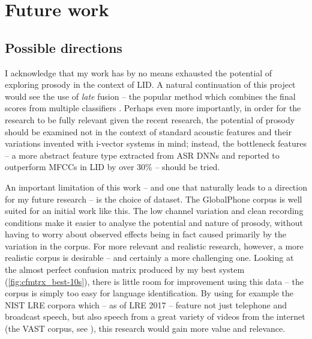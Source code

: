\documentclass[bsc,frontabs,twoside,singlespacing,parskip,deptreport]{infthesis}
\begin{document}
\chapter{Future work}{
  \label{chap:future-work}

  \section{Possible directions}{
    \label{sec:future-directions}

    I acknowledge that my work has by no means exhausted the potential of exploring prosody in the context of LID.
    A natural continuation of this project would see the use of \textit{late} fusion -- the popular method which combines the final scores from multiple classifiers \citep{Martinez_et_al_2012,Gelly_et_al_2016,Plchot_et_al_2016}.
    Perhaps even more importantly, in order for the research to be fully relevant given the recent research, the potential of prosody should be examined not in the context of standard acoustic features and their variations invented with i-vector systems in mind; instead, the bottleneck features -- a more abstract feature type extracted from ASR DNNs and reported to outperform MFCCs in LID by over 30\% \citep{Snyder_et_al_2018} -- should be tried.

    An important limitation of this work -- and one that naturally leads to a direction for my future research -- is the choice of dataset. The GlobalPhone corpus is well suited for an initial work like this. The low channel variation and clean recording conditions make it easier to analyse the potential and nature of prosody, without having to worry about observed effects being in fact caused primarily by the variation in the corpus. For more relevant and realistic research, however, a more realistic corpus is desirable -- and certainly a more challenging one. Looking at the almost perfect confusion matrix produced by my best system (\autoref{fig:cfmtrx_best-10s}), there is little room for improvement using this data -- the corpus is simply too easy for language identification. By using for example the NIST LRE corpora which -- as of LRE 2017 -- feature not just telephone and broadcast speech, but also speech from a great variety of videos from the internet (the VAST corpus, see \citet{Tracey_Strassel_2018}), this research would gain more value and relevance.

}}
\end{document}
